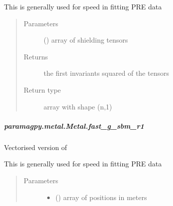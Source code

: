 \documentclass[a4paper,10pt,english,openany,oneside]{sphinxmanual}
\begin{document}
\begin{fulllineitems}
\begin{fulllineitems}
\begin{fulllineitems}
This is generally used for speed in fitting PRE data
\begin{quote}\begin{description}
\item[{Parameters}] \leavevmode
{} (\sphinxstyleliteralemphasis{\sphinxupquote{ (}}\sphinxstyleliteralemphasis{\sphinxupquote{,}}\sphinxstyleliteralemphasis{\sphinxupquote{,}}\sphinxstyleliteralemphasis{\sphinxupquote{)}}) \textendash{} array of shielding tensors

\item[{Returns}] \leavevmode
{} \textendash{} the first invariants squared of the tensors

\item[{Return type}] \leavevmode
array with shape (n,1)

\end{description}\end{quote}

\end{fulllineitems}



\subparagraph{paramagpy.metal.Metal.fast\_g\_sbm\_r1}
\label{\detokenize{reference/generated/paramagpy.metal.Metal.fast_g_sbm_r1:paramagpy-metal-metal-fast-g-sbm-r1}}\label{\detokenize{reference/generated/paramagpy.metal.Metal.fast_g_sbm_r1::doc}}

\begin{fulllineitems}
\label{\detokenize{reference/generated/paramagpy.metal.Metal.fast_g_sbm_r1:paramagpy.metal.Metal.fast_g_sbm_r1}}
Vectorised version of {\hyperref[\detokenize{reference/generated/paramagpy.metal.Metal.g_sbm_r1:paramagpy.metal.Metal.g_sbm_r1}]{}}

This is generally used for speed in fitting PRE data
\begin{quote}\begin{description}
\item[{Parameters}] \leavevmode\begin{itemize}
\item {} 
 (\sphinxstyleliteralemphasis{\sphinxupquote{ (}}\sphinxstyleliteralemphasis{\sphinxupquote{,}}\sphinxstyleliteralemphasis{\sphinxupquote{)}}) \textendash{} array of positions in meters


\end{itemize}
\end{description}
\end{quote}
\end{fulllineitems}
\end{fulllineitems}
\end{fulllineitems}
\end{document}
